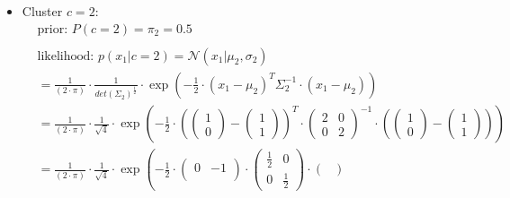 \documentclass[12pt]{article}
\begin{document}
\begin{enumerate}
\begin{itemize}[label=]
            \item Cluster $c=2$:
            \begin{equation*}
                \begin{aligned}
                    &\text{prior: } P(c=2) = \pi_2 = \mathbf{0.5} \\
                    \\
                    &\text{likelihood: } p(x_1|c=2) = \mathcal{N}(x_1| \mu_2, \sigma_2) \\
                    &= \frac{1}{(2 \cdot \pi)} \cdot \frac{1}{det(\Sigma_2)^\frac{1}{2}} \cdot \exp \left( -\frac{1}{2} \cdot (x_1 - \mu_2)^{T} \Sigma_2^{-1} \cdot (x_1 - \mu_2) \right)\\
                    &= \frac{1}{(2 \cdot \pi)} \cdot \frac{1}{\sqrt{4}} \cdot \exp \left( -\frac{1}{2} \cdot \left(\begin{pmatrix}
                    1\\
                    0
                    \end{pmatrix} - \begin{pmatrix}
                    1\\
                    1
                    \end{pmatrix}\right)^{T} \cdot \begin{pmatrix}
                    2 & 0\\
                    0 & 2
                    \end{pmatrix}^{-1} \cdot \left(\begin{pmatrix}
                    1\\
                    0
                    \end{pmatrix} - \begin{pmatrix}
                    1\\
                    1
                    \end{pmatrix}\right) \right)\\
                    &= \frac{1}{(2 \cdot \pi)} \cdot \frac{1}{\sqrt{4}} \cdot \exp \left( -\frac{1}{2} \cdot \begin{pmatrix}
                    0 & -1\\
                    \end{pmatrix} \cdot \begin{pmatrix}
                    \frac{1}{2} & 0\\
                    0 & \frac{1}{2}
                    \end{pmatrix} \cdot \begin{pmatrix}

\end{pmatrix}
\end{aligned}
\end{equation*}
\end{itemize}
\end{enumerate}
\end{document}
